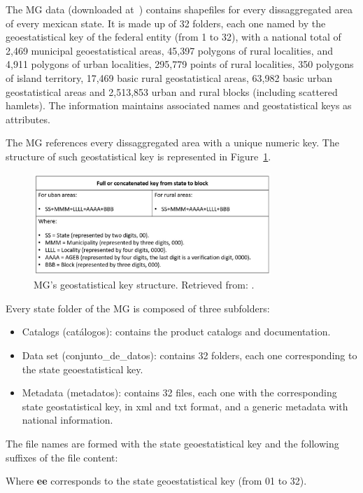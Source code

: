 The MG data (downloaded at~\cite{MG_data}) contains shapefiles for every dissaggregated area of every mexican state. It is made up of 32 folders, each one named by the geoestatistical key of the federal entity (from 1 to 32), with a national total of 2,469 municipal geoestatistical areas, 45,397 polygons of rural localities, and 4,911 polygons of urban localities, 295,779 points of rural localities, 350 polygons of island territory, 17,469 basic rural geostatistical areas, 63,982 basic urban geostatistical areas and 2,513,853 urban and rural blocks (including scattered hamlets). The information maintains associated names and geostatistical keys as attributes.

The MG references every dissaggregated area with a unique numeric key. The structure of such geostatistical key is represented in Figure~\ref{fig:key_structure}.

\begin{figure}[htpb]
  \centering
  \includegraphics[width=0.8\textwidth]{Figures/key_structure.jpg}
  \caption{MG's geostatistical key structure. Retrieved from: \cite{manualMGN}.
    \label{fig:key_structure}}
\end{figure}

Every state folder of the MG is composed of three subfolders:
\begin{itemize}
\item Catalogs (catálogos): contains the product catalogs and documentation.
\item Data set (conjunto\_de\_datos): contains 32 folders, each one corresponding to the state geoestatistical key.
\item Metadata (metadatos): contains 32 files, each one with the corresponding state geostatistical key, in xml and txt format, and a generic metadata with national information.
\end{itemize}

The file names are formed with the state geoestatistical key and the following suffixes of the file content:

Where \textbf{ee} corresponds to the state geoestatistical key (from 01 to 32).

